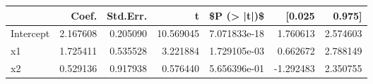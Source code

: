 \begin{tabular}{lrrrrrr}
\toprule
{} &     Coef. &  Std.Err. &          t &   \$P (> |t|)\$ &    [0.025 &    0.975] \\
\midrule
Intercept &  2.167608 &  0.205090 &  10.569045 &  7.071833e-18 &  1.760613 &  2.574603 \\
x1        &  1.725411 &  0.535528 &   3.221884 &  1.729105e-03 &  0.662672 &  2.788149 \\
x2        &  0.529136 &  0.917938 &   0.576440 &  5.656396e-01 & -1.292483 &  2.350755 \\
\bottomrule
\end{tabular}
